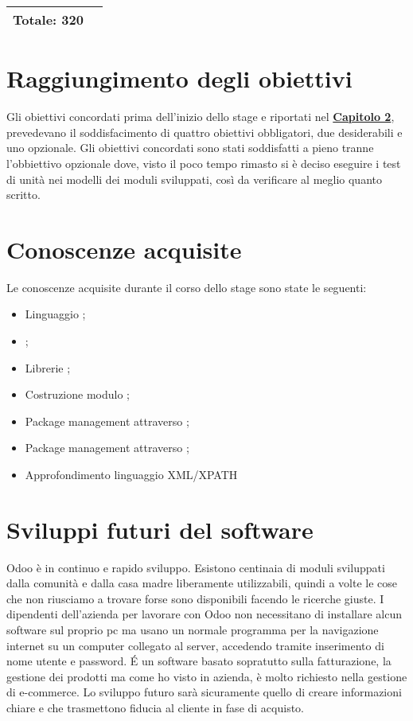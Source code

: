 \begin{center}
\begin{tabular}{|l|l|c l|}
		\hline
		
		\multicolumn{2}{|l|}{\textbf{Totale: 320}} & \multicolumn{2}{l|}{}\\
		\hline
		
	\end{tabular}
	\label{tab:consuntivo_finale}  
\end{center}
\section{Raggiungimento degli obiettivi}
Gli obiettivi concordati prima dell'inizio dello stage e riportati nel \hyperlink{(chap:capitolo2)}{\textbf{Capitolo 2}}, prevedevano il soddisfacimento di quattro obiettivi obbligatori, due desiderabili e uno opzionale.
Gli obiettivi concordati sono stati soddisfatti a pieno tranne l'obbiettivo opzionale dove, visto il poco tempo rimasto si è deciso eseguire i test di unità nei modelli dei moduli sviluppati, così da verificare al meglio quanto scritto.\\
\newpage
\section{Conoscenze acquisite}
Le conoscenze acquisite durante il corso dello stage sono state le seguenti:
\begin{itemize}
	\item Linguaggio ;
	\item {};
	\item Librerie ;
	\item Costruzione modulo ;
	\item Package management attraverso ;
	\item Package management attraverso ;
	\item Approfondimento linguaggio XML/XPATH

\end{itemize}


\section{Sviluppi futuri del software}
Odoo è in continuo e rapido sviluppo. Esistono centinaia di moduli sviluppati dalla comunità e dalla casa madre liberamente utilizzabili, quindi a volte le cose che non riusciamo a trovare forse sono disponibili facendo le ricerche giuste. 
I dipendenti dell'azienda per lavorare con Odoo non necessitano
di installare alcun software sul proprio pc ma usano un normale
programma per la navigazione internet su un computer collegato al
server, accedendo tramite inserimento di nome utente e password.
\'E un software basato sopratutto sulla fatturazione, la gestione dei prodotti ma come ho visto in azienda, è molto richiesto nella gestione di e-commerce. Lo sviluppo futuro sarà sicuramente quello di creare informazioni chiare e che trasmettono fiducia al cliente in fase di acquisto.


